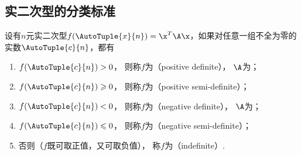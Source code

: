 \subsection{实二次型的分类标准}
\begin{definition}
设有\(n\)元实二次型\(f(\AutoTuple{x}{n}) = \x^T\A\x\)，如果对任意一组不全为零的实数\(\AutoTuple{c}{n}\)，都有
\begin{enumerate}
\item \(f(\AutoTuple{c}{n}) > 0\)，%
则称\(f\)为（positive definite），%
\(\A\)为；
\item \(f(\AutoTuple{c}{n}) \geqslant 0\)，%
则称\(f\)为（positive semi-definite）；
\item \(f(\AutoTuple{c}{n}) < 0\)，%
则称\(f\)为（negative definite），%
\(\A\)为；
\item \(f(\AutoTuple{c}{n}) \leqslant 0\)，%
则称\(f\)为（negative semi-definite）；
\item 否则（\(f\)既可取正值，又可取负值），%
称\(f\)为（indefinite）.
\end{enumerate}
\end{definition}

